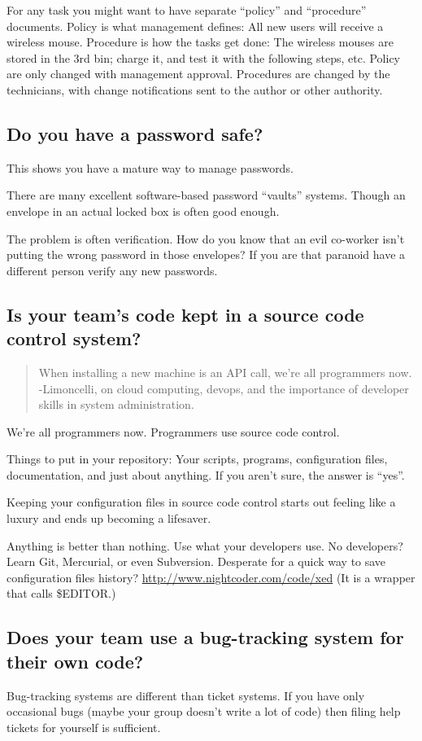 \documentclass{article}
\begin{document}
For any task you might want to have separate ``policy'' and ``procedure'' documents. Policy is what management defines: All new users will receive a wireless mouse. Procedure is how the tasks get done: The wireless mouses are stored in the 3rd bin; charge it, and test it with the following steps, etc. Policy are only changed with management approval. Procedures are changed by the technicians, with change notifications sent to the author or other authority.

\subsection{Do you have a password safe?}
This shows you have a mature way to manage passwords.

There are many excellent software-based password ``vaults'' systems. Though an envelope in an actual locked box is often good enough.

The problem is often verification. How do you know that an evil co-worker isn't putting the wrong password in those envelopes? If you are that paranoid have a different person verify any new passwords.

\subsection{Is your team's code kept in a source code control system? \Checkmark}
\begin{quote}
When installing a new machine is an API call, we're all programmers now. -Limoncelli, on cloud computing, devops, and the importance of developer skills in system administration.
\end{quote}

We're all programmers now. Programmers use source code control.

Things to put in your repository: Your scripts, programs, configuration files, documentation, and just about anything. If you aren't sure, the answer is ``yes''.

Keeping your configuration files in source code control starts out feeling like a luxury and ends up becoming a lifesaver.

Anything is better than nothing. Use what your developers use. No developers? Learn Git, Mercurial, or even Subversion. Desperate for a quick way to save configuration files history? \url{http://www.nightcoder.com/code/xed} (It is a wrapper that calls \$EDITOR.)

\subsection{Does your team use a bug-tracking system for their own code?}
Bug-tracking systems are different than ticket systems. If you have only occasional bugs (maybe your group doesn't write a lot of code) then filing help tickets for yourself is sufficient.
\end{document}
